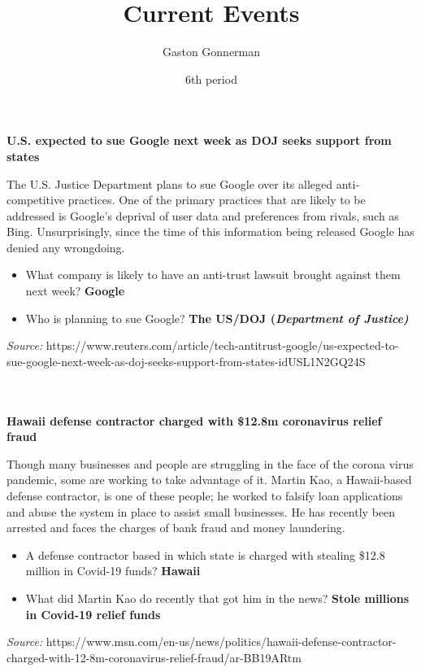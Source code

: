\documentclass{article}
\title{Current Events}
\author{Gaston Gonnerman}
\date{6th period}
\begin{document}
	\maketitle
	
	\begin{center}
		\large{
			\textbf{U.S. expected to sue Google next week as DOJ seeks support from states}
		}
	\end{center}
	\par The U.S. Justice Department plans to sue Google over its alleged anti-competitive practices. One of the primary practices that are likely to be addressed is Google's deprival of user data and preferences from rivals, such as Bing. Unsurprisingly, since the time of this information being released Google has denied any wrongdoing.
	
	\begin{itemize}[label=--]
		\item What company is likely to have an anti-trust lawsuit brought against them next week? \textbf{Google}
		\item Who is planning to sue Google? \textbf{The US/DOJ (\emph{Department of Justice)}}
	\end{itemize}

	\noindent
	\emph{Source:} https://www.reuters.com/article/tech-antitrust-google/us-expected-to-sue-google-next-week-as-doj-seeks-support-from-states-idUSL1N2GQ24S
	\\ \\ \\
	
	\begin{center}
		\large{
			\textbf{Hawaii defense contractor charged with \$12.8m coronavirus relief fraud}
		}
	\end{center}
	\par Though many businesses and people are struggling in the face of the corona virus pandemic, some are working to take advantage of it. Martin Kao, a Hawaii-based defense contractor, is one of these people; he worked to falsify loan applications and abuse the system in place to assist small businesses. He has recently been arrested and faces the charges of bank fraud and money laundering.
	
	\begin{itemize}[label=--]
		\item A defense contractor based in which state is charged with stealing \$12.8 million in Covid-19 funds? \textbf{Hawaii}
		\item What did Martin Kao do recently that got him in the news? \textbf{Stole millions in Covid-19 relief funds}
	\end{itemize}

	\noindent
	\emph{Source:} https://www.msn.com/en-us/news/politics/hawaii-defense-contractor-charged-with-12-8m-coronavirus-relief-fraud/ar-BB19ARtm
\end{document}
